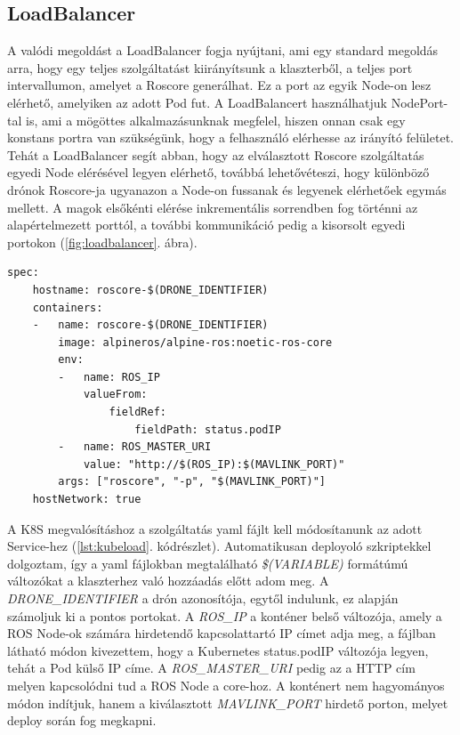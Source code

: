 \subsection{LoadBalancer}
A valódi megoldást a LoadBalancer fogja nyújtani, ami egy standard megoldás arra, hogy egy teljes szolgáltatást kiirányítsunk a klaszterből, a teljes port intervallumon, amelyet a Roscore generálhat. Ez a port az egyik Node-on lesz elérhető, amelyiken az adott Pod fut. A LoadBalancert használhatjuk NodePort-tal is, ami a mögöttes alkalmazásunknak megfelel, hiszen onnan csak egy konstans portra van szükségünk, hogy a felhasználó elérhesse az irányító felületet. Tehát a LoadBalancer segít abban, hogy az elválasztott Roscore szolgáltatás egyedi Node elérésével legyen elérhető, továbbá lehetővéteszi, hogy különböző drónok Roscore-ja ugyanazon a Node-on fussanak és legyenek elérhetőek egymás mellett. A magok elsőkénti elérése inkrementális sorrendben fog történni az alapértelmezett porttól, a további kommunikáció pedig a kisorsolt egyedi portokon (\ref{fig:loadbalancer}. ábra). \\

\begin{minipage}{\linewidth}
\begin{lstlisting}[caption={Roscore Service specifikációja inkrementális változókkal}, label={lst:kubeload}]
spec:
	hostname: roscore-$(DRONE_IDENTIFIER)
	containers:
	-	name: roscore-$(DRONE_IDENTIFIER)
		image: alpineros/alpine-ros:noetic-ros-core 
		env:
		-	name: ROS_IP
			valueFrom:
				fieldRef:
					fieldPath: status.podIP
		-	name: ROS_MASTER_URI
			value: "http://$(ROS_IP):$(MAVLINK_PORT)"
		args: ["roscore", "-p", "$(MAVLINK_PORT)"]
	hostNetwork: true
\end{lstlisting}
\end{minipage}

\noindent
A K8S megvalósításhoz a szolgáltatás yaml fájlt kell módosítanunk az adott Service-hez (\ref{lst:kubeload}. kódrészlet). Automatikusan deployoló szkriptekkel dolgoztam, így a yaml fájlokban megtalálható \emph{\$(VARIABLE)} formátúmú változókat a klaszterhez való hozzáadás előtt adom meg. A \emph{DRONE\_IDENTIFIER} a drón azonosítója, egytől indulunk, ez alapján számoljuk ki a pontos portokat. A \emph{ROS\_IP} a konténer belső változója, amely a ROS Node-ok számára hirdetendő kapcsolattartó IP címet adja meg, a fájlban látható módon kivezettem, hogy a Kubernetes status.podIP változója legyen, tehát a Pod külső IP címe. A \emph{ROS\_MASTER\_URI} pedig az a HTTP cím melyen kapcsolódni tud a ROS Node a core-hoz. A konténert nem hagyományos módon indítjuk, hanem a kiválasztott \emph{MAVLINK\_PORT} hirdető porton, melyet deploy során fog megkapni. \\

